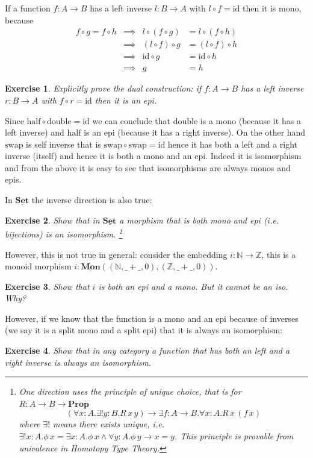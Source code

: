 \documentclass{article}
\newcommand{\Prop}{\mathbf{Prop}}
\newcommand{\Set}{\mathbf{Set}}
\newcommand{\cat}[1]{\underline{\mathbf{#1}}}
\newcommand{\id}{\mathrm{id}}
\newcommand{\Nat}{\mathbb{N}}
\newcommand{\Int}{\mathbb{Z}}
\newcommand{\half}{\mathrm{half}}
\newcommand{\double}{\mathrm{double}}
\newcommand{\swap}{\mathrm{swap}}
\newtheorem{exercise}{Exercise}
\begin{document}
If a function $f : A \to B$ has a left inverse $l : B \to A$ with $l \circ f = \id$ then it is mono, because  
\begin{align*}
f \circ g = f \circ h 
& \implies & l \circ (f \circ g) & = l \circ (f \circ h) \\
& \implies & (l \circ f) \circ g& = (l \circ f) \circ h \\
& \implies &\id \circ g & = \id \circ h \\
& \implies & g & = h 
\end{align*}
\begin{exercise}
  Explicitly prove the dual construction: if $f : A \to B$ has a left inverse $r : B \to A$ with $f \circ r = \id$ then it is an epi.
\end{exercise}
Since $\half \circ \double = \id$ we can conclude that $\double$ is a mono (because it has a left inverse) and $\half$ is an epi (because it has a right inverse). On the other hand $\swap$ is self inverse that is $\swap \circ \swap = \id$ hence it has both a left and a right inverse (itself) and hence it is both a mono and an epi. 
 Indeed it is isomorphism and from the above it is easy to see that isomorphisms are always monos and epis. 

In $\cat{\Set}$ the inverse direction is also true: 
\begin{exercise}
  Show that in $\cat{\Set}$ a morphism that is both mono and epi (i.e. bijections) is an isomorphism.
\footnote{One direction uses the principle of unique choice, that is for $R : A \to B \to \Prop$~
\[(\forall x:A.\exists! y:B .R\,x\,y) \to \exists f :A \to B . \forall x:A.R\,x\,(f\,x) \]
where $\exists!$ means there exists unique, i.e. $\exists! x:A.\phi\,x = \exists x:A.\phi\,x \wedge \forall y:A.\phi\,y \to x=y$. This principle is provable from univalence in Homotopy Type Theory.} 
\end{exercise}
However, this is not true in general: consider the embedding $i : \Nat \to \Int$, this is a monoid morphism $i : \cat{Mon}((\Nat,\_+\_,0),(\Int,\_+\_,0))$. 
\begin{exercise}
  Show that $i$ is both an epi and a mono. But it cannot be an iso. Why?
\end{exercise}
However, if we know that the function is a mono and an epi because of inverses (we say it is a split mono and a split epi) that it is always an isomorphism:
\begin{exercise}
  Show that in any category a function that has both an left and a right inverse is always an isomorphism.
\end{exercise}
\end{document}
